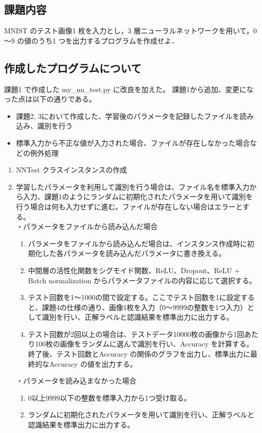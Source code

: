 \documentclass[a4paper,dvipdfmx]{jsarticle}
\begin{document}
\subsection*{課題内容}

MNIST のテスト画像1 枚を入力とし，3 層ニューラルネットワークを用いて，0～9 の値のうち1 つを出力するプログラムを作成せよ．

\subsection*{作成したプログラムについて}

課題1 で作成した my\_nn\_test.py に改良を加えた。
課題1から追加、変更になった点は以下の通りである。

\begin{itemize}
	\item 課題2, 3において作成した、学習後のパラメータを記録したファイルを読み込み、識別を行う
	\item 標準入力から不正な値が入力された場合、ファイルが存在しなかった場合などの例外処理
\end{itemize}

\begin{enumerate}
	\item NNTest クラスインスタンスの作成
	\item 学習したパラメータを利用して識別を行う場合は、ファイル名を標準入力から入力、課題1のようにランダムに初期化されたパラメータを用いて識別を行う場合は何も入力せずに進む。ファイルが存在しない場合はエラーとする。\\
	・パラメータをファイルから読み込んだ場合
	\begin{enumerate}
		\item パラメータをファイルから読み込んだ場合は、インスタンス作成時に初期化した各パラメータを読み込んだパラメータに書き換える。
		\item 中間層の活性化関数をシグモイド関数、ReLU、Dropout、ReLU + Batch normalization からパラメータファイルの内容に応じて選択する。 
		\item テスト回数を1〜1000の間で設定する。ここでテスト回数を1に設定すると、課題4の仕様の通り、画像1枚を入力（0〜9999の整数を1つ入力）として識別を行い、正解ラベルと認識結果を標準出力に出力する。
		\item テスト回数が2回以上の場合は、テストデータ10000枚の画像から1回あたり100枚の画像をランダムに選んで識別を行い、Accuracy を計算する。終了後、テスト回数とAccuracy の関係のグラフを出力し、標準出力に最終的なAccuracy の値を出力する。
	\end{enumerate}
	・パラメータを読み込まなかった場合
	\begin{enumerate}
		\item 0以上9999以下の整数を標準入力から1つ受け取る。
		\item ランダムに初期化されたパラメータを用いて識別を行い、正解ラベルと認識結果を標準出力に出力する。
	\end{enumerate}
\end{enumerate}
\end{document}
